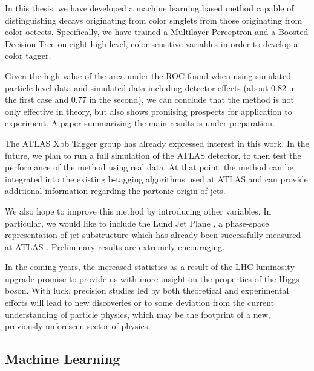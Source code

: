 \documentclass[10pt,a4paper]{book}
\begin{document}
In this thesis, we have developed a machine learning based method capable of distinguishing decays originating from color singlets from those originating from color octects. Specifically, we have trained a Multilayer Perceptron and a Boosted Decision Tree on eight high-level, color sensitive variables in order to develop a color tagger. 

Given the high value of the area under the ROC found when using simulated particle-level data and simulated data including detector effects (about 0.82 in the first case and 0.77 in the second), we can conclude that the method is not only effective in theory, but also shows promising prospects for application to experiment. A paper summarizing the main results is under preparation.

The ATLAS Xbb Tagger group has already expressed interest in this work. In the future, we plan to run a full simulation of the ATLAS detector, to then test the performance of the method using real data. At that point, the method can be integrated into the existing b-tagging algorithms used at ATLAS and can provide additional information regarding the partonic origin of jets.

We also hope to improve this method by introducing other variables. In particular, we would like to include the Lund Jet Plane \cite{Dreyer:2018nbf}, a phase-space representation of jet substructure which has already been successfully measured at ATLAS \cite{ATLAS:2020bbn}. Preliminary results are extremely encouraging. 

In the coming years, the increased statistics as a result of the LHC luminosity upgrade promise to provide us with more insight on the properties of the Higgs boson. With luck, precision studies led by both theoretical and experimental efforts will lead to new discoveries or to some deviation from the current understanding of particle physics, which may be the footprint of a new, previously unforeseen sector of physics.


\begin{appendices}
\chapter{Machine Learning}
\label{Appendix}

\end{appendices}



\end{document}
